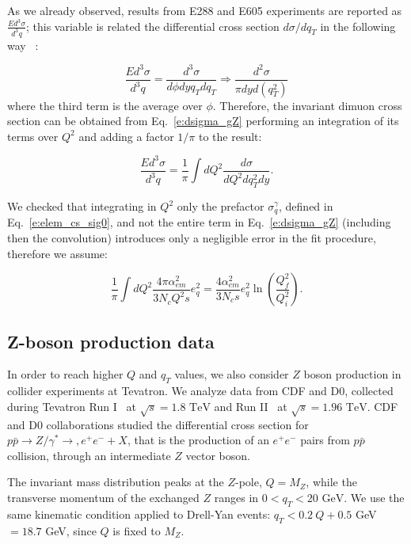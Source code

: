 \documentclass[aps,preprintnumbers,showpacs,nofootinbib,superscriptaddress,floatfix]{revtex4}
\begin{document}
As we already observed, results from E288 and E605 experiments are reported as $\frac{Ed^3\sigma}{d^3q}$; this variable is related the differential cross section $d\sigma/dq_T$ in the following way~\cite{Olive:2016xmw} :

\begin{equation}
\frac{Ed^3\sigma}{d^3q}=\frac{d^3\sigma}{d\phi dy q_T dq_T} \Rightarrow \frac{d^2\sigma}{\pi dy d(q^2_T)}
\end{equation}
where the third term is the average over $\phi$.
Therefore, the invariant dimuon cross section can be obtained from Eq.~\ref{e:dsigma_gZ} performing an integration of its terms over $Q^2$ and adding a factor $1/\pi$ to the result:

\begin{equation}
\frac{Ed^3\sigma}{d^3q} = \frac{1}{\pi} \int dQ^2 \frac{d\sigma}{dQ^2dq^2_T dy} .
\end{equation}

We checked that integrating in $Q^2$ only the prefactor $\sigma_q^\gamma$, defined in Eq.~\ref{e:elem_cs_sig0}, and not the entire term in Eq.~\ref{e:dsigma_gZ} (including then the convolution) introduces only a negligible error in the fit procedure, therefore we assume:  

\begin{equation}
\frac{1}{\pi}  \int dQ^2 \frac{4\pi \alpha^2_{em}}{3N_cQ^2 s} e_q^2 
= \frac{4\alpha_{em}^2}{3 N_c s} e_q^2 \ln \left( \frac{Q_f^2}{Q_i^2} \right) .
\end{equation}

\subsection{Z-boson production data}
\label{ss:zboson}

In order to reach higher $Q$ and $q_T$ values, we also consider $Z$ boson production in collider experiments at Tevatron. 
We analyze data from CDF and D0, collected during Tevatron Run I~\cite{Affolder:1999jh,Abbott:1999wk} at $\sqrt{s}=1.8\text{ TeV}$ and Run II~\cite{Aaltonen:2012fi,Abazov:2007ac} at $\sqrt{s}=1.96\text{ TeV}$. CDF and D0 collaborations studied the differential cross section for $p\bar{p}\rightarrow Z/\gamma^* \rightarrow, e^+e^- + X$, that is the production of an $e^+e^-$ pairs from $p\bar{p}$ collision,  through an intermediate $Z$ vector boson. 

The invariant mass distribution peaks at the $Z$-pole, $Q=M_Z$, while the transverse momentum of the exchanged $Z$ ranges in $0< q_T < 20 \text{ GeV}$.
We use the same kinematic condition applied to Drell-Yan events:  $q_T < 0.2\ Q + 0.5$ GeV $ = 18.7$ GeV, since $Q$ is fixed to $M_Z$. 
\end{document}
